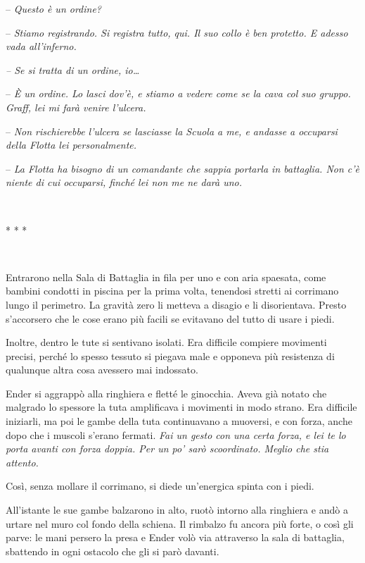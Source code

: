 {-- \emph{Questo è un ordine?}}

{-- \emph{Stiamo registrando. Si registra tutto, qui. Il suo collo è ben
		protetto. E adesso vada all'inferno.}}

\emph{{-- Se si tratta di un ordine, io\ldots{}}}

{-- \emph{È un ordine. Lo lasci dov'è, e stiamo a vedere come se la cava
		col suo gruppo. Graff, lei mi farà venire l'ulcera.}}

{-- \emph{Non rischierebbe l'ulcera se lasciasse la Scuola a me, e
		andasse a occuparsi della Flotta lei personalmente.}}

{-- \emph{La Flotta ha bisogno di un comandante che sappia portarla in
		battaglia. Non c'è niente di cui occuparsi, finché lei non me ne darà
		uno.}}

{~}

\begin{center}
	{* * *}
\end{center}

{~}

{Entrarono nella Sala di Battaglia in fila per uno e con aria spaesata,
	come bambini condotti in piscina per la prima volta, tenendosi stretti
	ai corrimano lungo il perimetro. La gravità zero li metteva a disagio e
	li disorientava. Presto s'accorsero che le cose erano più facili se
	evitavano del tutto di usare i piedi.}

{Inoltre, dentro le tute si sentivano isolati. Era difficile compiere
	movimenti precisi, perché lo spesso tessuto si piegava male e opponeva
	più resistenza di qualunque altra cosa avessero mai indossato.}

{Ender si aggrappò alla ringhiera e fletté le ginocchia. Aveva già
	notato che malgrado lo spessore la tuta amplificava i movimenti in modo
	strano. Era difficile iniziarli, ma poi le gambe della tuta continuavano
	a muoversi, e con forza, anche dopo che i muscoli s'erano fermati.
	\emph{Fai un gesto con una certa forza, e lei te lo porta avanti con
		forza doppia. Per un po' sarò scoordinato. Meglio che stia attento.}}

{Così, senza mollare il corrimano, si diede un'energica spinta con i
	piedi.}

{All'istante le sue gambe balzarono in alto, ruotò intorno alla
	ringhiera e andò a urtare nel muro col fondo della schiena. Il rimbalzo
	fu ancora più forte, o così gli parve: le mani persero la presa e Ender
	volò via attraverso la sala di battaglia, sbattendo in ogni ostacolo che
	gli si parò davanti.}

